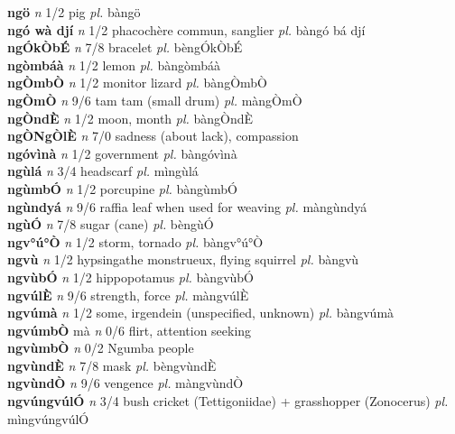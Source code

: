 \documentclass{article}
\begin{document}
{\bf ngö}  {\it n} 1/2 pig {\it pl.} bàngö         \\ 
{\bf ngó wà djí}  {\it n} 1/2 phacochère commun, sanglier {\it pl.} bàngó bá djí         \\ 
{\bf ngÓkÒbÉ}  {\it n} 7/8 bracelet {\it pl.} bèngÓkÒbÉ         \\ 
{\bf ngòmbáà}  {\it n} 1/2 lemon {\it pl.} bàngòmbáà         \\ 
{\bf ngÒmbÒ}  {\it n} 1/2 monitor lizard {\it pl.} bàngÒmbÒ         \\ 
{\bf ngÒmÒ}  {\it n} 9/6 tam tam (small drum) {\it pl.} màngÒmÒ         \\ 
{\bf ngÒndÈ}  {\it n} 1/2 moon, month {\it pl.} bàngÒndÈ         \\ 
{\bf ngÒNgÒlÈ}  {\it n} 7/0 sadness (about lack), compassion         \\ 
{\bf ngóvìnà}  {\it n} 1/2 government {\it pl.} bàngóvìnà         \\ 
{\bf ngùlá}  {\it n} 3/4 headscarf {\it pl.} mìngùlá         \\ 
{\bf ngùmbÓ}  {\it n} 1/2 porcupine {\it pl.} bàngùmbÓ         \\ 
{\bf ngùndyá}  {\it n} 9/6 raffia leaf when used for weaving {\it pl.} màngùndyá         \\ 
{\bf ngùÓ}  {\it n} 7/8 sugar (cane) {\it pl.} bèngùÓ         \\ 
{\bf ngv°ú°Ò}  {\it n} 1/2 storm, tornado {\it pl.} bàngv°ú°Ò         \\ 
{\bf ngvù}  {\it n} 1/2 hypsingathe monstrueux, flying squirrel {\it pl.} bàngvù         \\ 
{\bf ngvùbÓ}  {\it n} 1/2 hippopotamus {\it pl.} bàngvùbÓ         \\ 
{\bf ngvúlÈ}  {\it n} 9/6 strength, force {\it pl.} màngvúlÈ         \\ 
{\bf ngvúmà}  {\it n} 1/2 some, irgendein (unspecified, unknown) {\it pl.} bàngvúmà         \\ 
{\bf ngvúmbÒ} mà {\it n} 0/6 flirt, attention seeking         \\ 
{\bf ngvùmbÒ}  {\it n} 0/2 Ngumba people         \\ 
{\bf ngvùndÈ}  {\it n} 7/8 mask {\it pl.} bèngvùndÈ         \\ 
{\bf ngvùndÒ}  {\it n} 9/6 vengence {\it pl.} màngvùndÒ         \\ 
{\bf ngvúngvúlÓ}  {\it n} 3/4 bush cricket (Tettigoniidae) + grasshopper (Zonocerus) {\it pl.} mìngvúngvúlÓ         \\ 
\end{document}

